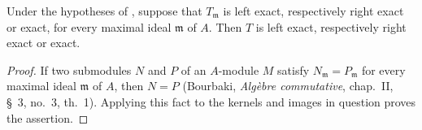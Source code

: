 \begin{proposition}[7.1.5]
\label{III.7.1.5}
Under the hypotheses of , suppose that
$T_{\mathfrak m}$ is left exact, respectively right exact or
exact, for every maximal ideal $\mathfrak m$ of $A$.  Then $T$
is left exact, respectively right exact or exact.
\end{proposition}

\begin{proof}
If two submodules $N$ and $P$ of an $A$-module $M$ satisfy $N_{\mathfrak m}=P_{\mathfrak m}$
for every maximal ideal $\mathfrak m$ of $A$, then $N=P$
(Bourbaki, \emph{Alg\`ebre commutative}, chap.~II, \S~3,
no.~3, th.~1).  Applying this fact to the kernels and images in
question proves the assertion.
\end{proof}


\ifdefined\EGAIIIStopAfterPageOneSevenNine
  \expandafter\endinput
\fi




\ifdefined\EGAIIIStopAfterPageOneEightNine
  \expandafter\endinput
\fi






\ifdefined\EGAIIIStopAfterPageOneNineNine
  \expandafter\endinput
\fi

\ifdefined\EGAIIIStopAfterPageTwoZeroEight
  \expandafter\endinput
\fi









